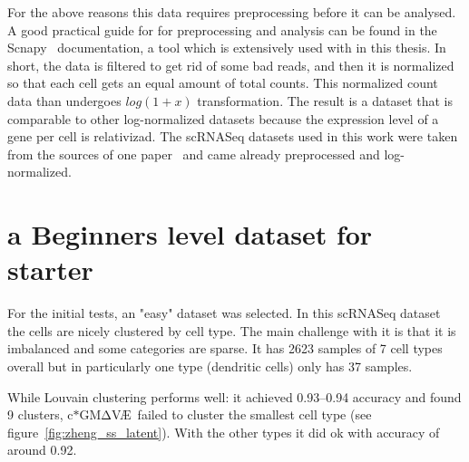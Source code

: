 \documentclass[11pt, a4paper]{report}
\theoremstyle{plain}
\theoremstyle{definition}
\theoremstyle{remark}
\newcommand{\gmvae}{c$\ast$GM$\mathrm{\Delta}$V\AE~}
\begin{document}
For the above reasons this data requires preprocessing before it can be
analysed. A good practical guide for for preprocessing and analysis 
can be found in the Scnapy~\cite{wolf2018scanpy} documentation, a tool which is 
extensively used with in this thesis.
In short, the data is filtered to get rid of some bad reads, and then it is
normalized so that each cell gets an equal amount of total counts. This
normalized  count data than undergoes $log(1+x)$ transformation.
The result is a dataset that is comparable to other
log-normalized datasets because the expression level of a gene per cell is 
relativizad.
The scRNASeq datasets used in this work were taken from the sources of one
paper~\cite{lotfollahi2019scgen} and came already preprocessed and
log-normalized.




\section{a Beginners level dataset for starter}

For the initial tests, an "easy" dataset was selected. In this scRNASeq dataset~\cite{zheng2017massively}
the cells are nicely clustered by cell type.
The main challenge with it is that it is imbalanced and some categories are
sparse. It has 2623 samples
of 7 cell types overall but in particularly one type (dendritic cells) only has 37 samples.

While Louvain clustering performs well: it achieved 0.93--0.94 accuracy and found 9
clusters, \gmvae failed to cluster the smallest cell type (see
figure~\ref{fig:zheng_ss_latent}). With the other types
it did ok with accuracy of around 0.92.
\end{document}
